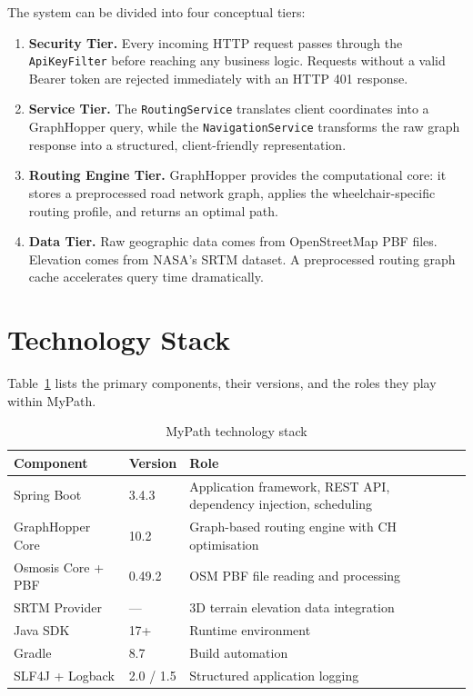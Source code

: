 \documentclass[12pt, a4paper]{report}
\begin{document}
The system can be divided into four conceptual tiers:

\begin{enumerate}[leftmargin=*, label=\textbf{\arabic*.}]
  \item \textbf{Security Tier.} Every incoming HTTP request passes through the \texttt{ApiKeyFilter} before reaching any business logic. Requests without a valid Bearer token are rejected immediately with an HTTP 401 response.
  \item \textbf{Service Tier.} The \texttt{RoutingService} translates client coordinates into a GraphHopper query, while the \texttt{NavigationService} transforms the raw graph response into a structured, client-friendly representation.
  \item \textbf{Routing Engine Tier.} GraphHopper provides the computational core: it stores a preprocessed road network graph, applies the wheelchair-specific routing profile, and returns an optimal path.
  \item \textbf{Data Tier.} Raw geographic data comes from OpenStreetMap PBF files. Elevation comes from NASA's SRTM dataset. A preprocessed routing graph cache accelerates query time dramatically.
\end{enumerate}

\section{Technology Stack}
\label{sec:stack}

Table~\ref{tab:stack} lists the primary components, their versions, and the roles they play within MyPath.

\begin{table}[H]
\centering
\caption{MyPath technology stack}
\label{tab:stack}
\begin{tabularx}{\textwidth}{@{}lllX@{}}
\toprule
\textbf{Component} & \textbf{Version} & \textbf{Role} \\
\midrule
Spring Boot & 3.4.3 & Application framework, REST API, dependency injection, scheduling \\
GraphHopper Core & 10.2 & Graph-based routing engine with CH optimisation \\
Osmosis Core + PBF & 0.49.2 & OSM PBF file reading and processing \\
SRTM Provider & — & 3D terrain elevation data integration \\
Java SDK & 17+ & Runtime environment \\
Gradle & 8.7 & Build automation \\
SLF4J + Logback & 2.0 / 1.5 & Structured application logging \\
\bottomrule
\end{tabularx}
\end{table}
\end{document}
